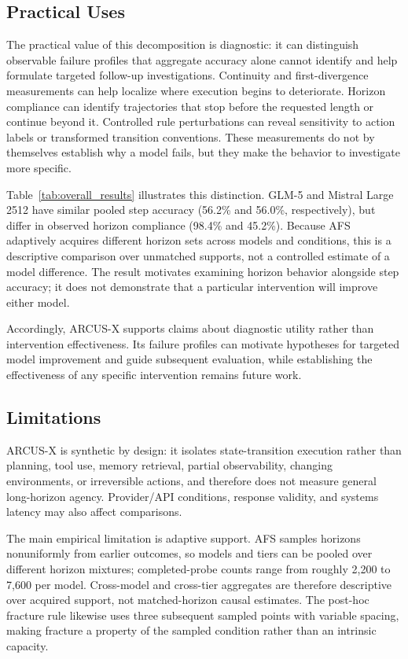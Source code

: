 \documentclass{article}
\begin{document}
\subsection{Practical Uses}
The practical value of this decomposition is diagnostic: it can distinguish observable failure profiles that aggregate accuracy alone cannot identify and help formulate targeted follow-up investigations. Continuity and first-divergence measurements can help localize where execution begins to deteriorate. Horizon compliance can identify trajectories that stop before the requested length or continue beyond it. Controlled rule perturbations can reveal sensitivity to action labels or transformed transition conventions. These measurements do not by themselves establish why a model fails, but they make the behavior to investigate more specific.

Table~\ref{tab:overall_results} illustrates this distinction. GLM-5 and Mistral Large 2512 have similar pooled step accuracy (56.2\% and 56.0\%, respectively), but differ in observed horizon compliance (98.4\% and 45.2\%). Because AFS adaptively acquires different horizon sets across models and conditions, this is a descriptive comparison over unmatched supports, not a controlled estimate of a model difference. The result motivates examining horizon behavior alongside step accuracy; it does not demonstrate that a particular intervention will improve either model.

Accordingly, ARCUS-X supports claims about diagnostic utility rather than intervention effectiveness. Its failure profiles can motivate hypotheses for targeted model improvement and guide subsequent evaluation, while establishing the effectiveness of any specific intervention remains future work.
\subsection{Limitations}
ARCUS-X is synthetic by design: it isolates state-transition execution rather than planning, tool use, memory retrieval, partial observability, changing environments, or irreversible actions, and therefore does not measure general long-horizon agency. Provider/API conditions, response validity, and systems latency may also affect comparisons.

The main empirical limitation is adaptive support. AFS samples horizons nonuniformly from earlier outcomes, so models and tiers can be pooled over different horizon mixtures; completed-probe counts range from roughly 2{,}200 to 7{,}600 per model. Cross-model and cross-tier aggregates are therefore descriptive over acquired support, not matched-horizon causal estimates. The post-hoc fracture rule likewise uses three subsequent sampled points with variable spacing, making fracture a property of the sampled condition rather than an intrinsic capacity.
\end{document}
